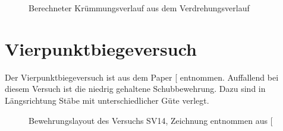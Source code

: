 \documentclass[
  10pt,
  letterpaper,
]{scrreprt}
\begin{document}
\begin{figure}[H]


\caption{\label{fig-chi-max-a3v2}Berechneter Krümmungsverlauf aus dem
Verdrehungsverlauf}

\end{figure}%

\newpage{}

\section{Vierpunktbiegeversuch}\label{vierpunktbiegeversuch}

Der Vierpunktbiegeversuch ist aus dem Paper
{[}\citeproc{ref-tue_einfluss_2019}{3}{]} entnommen. Auffallend bei
diesem Versuch ist die niedrig gehaltene Schubbewehrung. Dazu sind in
Längsrichtung Stäbe mit unterschiedlicher Güte verlegt.

\begin{figure}[H]


\caption{\label{fig-versuchsskizze-SV14}Bewehrungslayout des Versuchs
SV14, Zeichnung entnommen aus {[}\citeproc{ref-gitz_ansatze_2024}{1}{]}}

\end{figure}%
\end{document}
